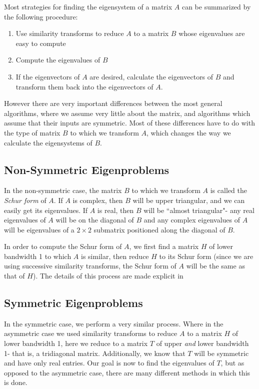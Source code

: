 \documentclass[10pt,twocolumn]{article}
\begin{document}
Most strategies for finding the eigensystem of a matrix $A$ can be summarized by the following procedure:
\begin{enumerate}
    \item Use similarity transforms to reduce $A$ to a matrix $B$ whose eigenvalues are easy to compute
    \item Compute the eigenvalues of $B$
    \item If the eigenvectors of $A$ are desired, calculate the eigenvectors of $B$ and transform them back into the eigenvectors of $A$.
\end{enumerate}

However there are very important differences between the most general algorithms, where we assume very little about the matrix, and algorithms which assume that their inputs are symmetric. Most of these differences have to do with the type of matrix $B$ to which we transform $A$, which changes the way we calculate the eigensystems of $B$.

\subsection{Non-Symmetric Eigenproblems}

In the non-symmetric case, the matrix $B$ to which we transform $A$ is called the \textit{Schur form} of $A$. If $A$ is complex, then $B$ will be upper triangular, and we can easily get its eigenvalues. If $A$ is real, then $B$ will be ``almost triangular"- any real eigenvalues of $A$ will be on the diagonal of $B$ and any complex eigenvalues of $A$ will be eigenvalues of a $2\times 2$ submatrix positioned along the diagonal of $B$. \cite{NonsymmEig} \cite[p.~388-391]{Golub_Van_Loan_2013}

In order to compute the Schur form of $A$, we first find a matrix $H$ of lower bandwidth 1 to which $A$ is similar, then reduce $H$ to its Schur form (since we are using successive similarity transforms, the Schur form of $A$ will be the same as that of $H$). The details of this process are made explicit in \cite{NonsymmEig} \cite[p.~388-391]{Golub_Van_Loan_2013}

\subsection{Symmetric Eigenproblems}

In the symmetric case, we perform a very similar process. Where in the asymmetric case we used similarity transforms to reduce $A$ to a matrix $H$ of lower bandwidth 1, here we reduce to a matrix $T$ of upper \textit{and} lower bandwidth 1- that is, a tridiagonal matrix. Additionally, we know that $T$ will be symmetric and have only real entries. \cite[p.~458]{Golub_Van_Loan_2013} Our goal is now to find the eigenvalues of $T$, but as opposed to the asymmetric case, there are many different methods in which this is done. \cite{SymmEig} 
\end{document}
